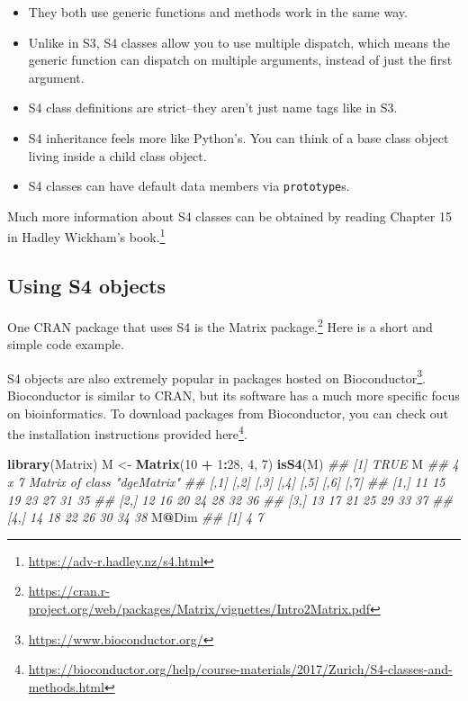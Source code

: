 \documentclass[12pt,krantz2]{krantz}
\makeatletter
\newenvironment{Shaded}{\begin{snugshade}}{\end{snugshade}}
\newcommand{\CommentTok}[1]{\textcolor[rgb]{0.37,0.37,0.37}{\textit{#1}}}
\newcommand{\DecValTok}[1]{\textcolor[rgb]{0.06,0.06,0.06}{#1}}
\newcommand{\KeywordTok}[1]{\textcolor[rgb]{0.27,0.27,0.27}{\textbf{#1}}}
\newcommand{\NormalTok}[1]{#1}
\newcommand{\OperatorTok}[1]{\textcolor[rgb]{0.43,0.43,0.43}{\textbf{#1}}}
\newcommand{\StringTok}[1]{\textcolor[rgb]{0.5,0.5,0.5}{#1}}
\providecommand{\tightlist}{%
  \setlength{\itemsep}{0pt}\setlength{\parskip}{0pt}}
\renewcommand{\href}[2]{#2\footnote{\url{#1}}}
\newenvironment{kframe}{%
\medskip{}
\setlength{\fboxsep}{.8em}
 \def\at@end@of@kframe{}%
 \ifinner\ifhmode%
  \def\at@end@of@kframe{\end{minipage}}%
  \begin{minipage}{\columnwidth}%
 \fi\fi%
 \def\FrameCommand##1{\hskip\@totalleftmargin \hskip-\fboxsep
 \colorbox{shadecolor}{##1}\hskip-\fboxsep
     \hskip-\linewidth \hskip-\@totalleftmargin \hskip\columnwidth}%
 \MakeFramed {\advance\hsize-\width
   \@totalleftmargin\z@ \linewidth\hsize
   \@setminipage}}%
 {\par\unskip\endMakeFramed%
 \at@end@of@kframe}
\renewenvironment{Shaded}{\begin{kframe}}{\end{kframe}}
\makeatother
\begin{document}
\begin{itemize}
\tightlist
\item
  They both use generic functions and methods work in the same way.
\item
  Unlike in S3, S4 classes allow you to use multiple dispatch, which means the generic function can dispatch on multiple arguments, instead of just the first argument.
\item
  S4 class definitions are strict--they aren't just name tags like in S3.
\item
  S4 inheritance feels more like Python's. You can think of a base class object living inside a child class object.
\item
  S4 classes can have default data members via \texttt{prototype}s.
\end{itemize}

Much more information about S4 classes can be obtained by reading \href{https://adv-r.hadley.nz/s4.html}{Chapter 15 in Hadley Wickham's book.}

\hypertarget{using-s4-objects}{%
\subsection{Using S4 objects}\label{using-s4-objects}}

One CRAN package that uses S4 is the \href{https://cran.r-project.org/web/packages/Matrix/vignettes/Intro2Matrix.pdf}{Matrix package.} Here is a short and simple code example.

\begin{rmd-details}
S4 objects are also extremely popular in packages hosted on \href{https://www.bioconductor.org/}{Bioconductor}. Bioconductor is similar to CRAN, but its software has a much more specific focus on bioinformatics. To download packages from Bioconductor, you can check out the installation instructions provided \href{https://bioconductor.org/help/course-materials/2017/Zurich/S4-classes-and-methods.html}{here}.

\end{rmd-details}

\begin{Shaded}
\begin{Highlighting}[]
\KeywordTok{library}\NormalTok{(Matrix)}
\NormalTok{M <-}\StringTok{ }\KeywordTok{Matrix}\NormalTok{(}\DecValTok{10} \OperatorTok{+}\StringTok{ }\DecValTok{1}\OperatorTok{:}\DecValTok{28}\NormalTok{, }\DecValTok{4}\NormalTok{, }\DecValTok{7}\NormalTok{)}
\KeywordTok{isS4}\NormalTok{(M)}
\CommentTok{## [1] TRUE}
\NormalTok{M}
\CommentTok{## 4 x 7 Matrix of class "dgeMatrix"}
\CommentTok{##      [,1] [,2] [,3] [,4] [,5] [,6] [,7]}
\CommentTok{## [1,]   11   15   19   23   27   31   35}
\CommentTok{## [2,]   12   16   20   24   28   32   36}
\CommentTok{## [3,]   13   17   21   25   29   33   37}
\CommentTok{## [4,]   14   18   22   26   30   34   38}
\NormalTok{M}\OperatorTok{@}\NormalTok{Dim}
\CommentTok{## [1] 4 7}
\end{Highlighting}
\end{Shaded}
\end{document}
